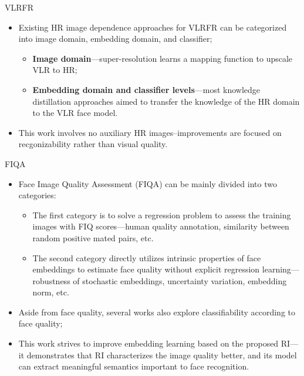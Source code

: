 \documentclass[aspectratio=169,xcolor=dvipsnames]{beamer}
\begin{document}
\begin{frame}{VLRFR}
    \begin{itemize}
        \item Existing HR image dependence approaches for VLRFR can be categorized into image domain, embedding domain, and classifier;
        \begin{itemize}
            \item \textbf{Image domain}---super-resolution learns a mapping function to upscale VLR to HR; %
            \item \textbf{Embedding domain and classifier levels}---most knowledge distillation approaches aimed to transfer the knowledge of the HR domain to the VLR face model. 
        \end{itemize}
        \item This work involves no auxiliary HR images--improvements are focused on recgonizability rather than visual quality.
    \end{itemize}
\end{frame}


\begin{frame}{FIQA}
    \begin{itemize}
        \item Face Image Quality Assessment (FIQA) can be mainly divided into two categories:
        \begin{itemize}
            \item The first category is to solve a regression problem to assess the training images with FIQ scores---human quality annotation, similarity between random positive mated pairs, etc.
            \item The second category directly utilizes intrinsic properties of face embeddings to estimate face quality without explicit regression learning---robustness of stochastic embeddings, uncertainty variation, embedding norm, etc.
        \end{itemize}
        \item Aside from face quality, several works also explore classifiability according to face quality;
        \item This work strives to improve embedding learning based on the proposed RI---it demonstrates that RI characterizes the image quality better, and its model can extract meaningful semantics important to face recognition.
    \end{itemize}
\end{frame}
\end{document}
